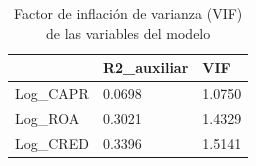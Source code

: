 \begin{table}[htbp]
\centering
\caption{Factor de inflación de varianza (VIF) de las variables del modelo}
\begin{tabular}{lll}
\hline
 & R2\_auxiliar & VIF \\
\hline
Log\_CAPR & 0.0698 & 1.0750 \\
Log\_ROA & 0.3021 & 1.4329 \\
Log\_CRED & 0.3396 & 1.5141 \\
\hline
\end{tabular}
\label{tab:tabla4_vif}
\end{table}